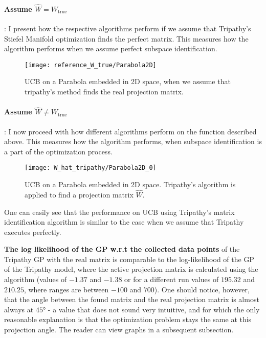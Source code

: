 \paragraph{Assume $\hat{W} = W_{\text{true}}$}: I present how the respective algorithms perform if we assume that Tripathy's Stiefel Manifold optimization finds the perfect matrix.
This measures how the algorithm performs when we assume perfect subspace identification.

\begin{figure}[H]
  \centering
      \texttt{[image: reference\_W\_true/Parabola2D]}
  \caption{UCB on a Parabola embedded in 2D space, when we assume that tripathy's method finds the real projection matrix.}
\end{figure}

\paragraph{Assume $\hat{W} \neq W_{\text{true}}$}: I now proceed with how different algorithms perform on the function described above.
This measures how the algorithm performs, when subspace identification is a part of the optimization process.

\begin{figure}[H]
  \centering
      \texttt{[image: W\_hat\_tripathy/Parabola2D\_0]}
  \caption{UCB on a Parabola embedded in 2D space.
  Tripathy's algorithm is applied to find a projection matrix $\hat{W}$.}
\end{figure}

One can easily see that the performance on UCB using Tripathy's matrix identification algorithm is similar to the case when we assume that Tripathy executes perfectly.



\textbf{The log likelihood of the GP w.r.t the collected data points} of the Tripathy GP with the real matrix is comparable to the log-likelihood of the GP of the Tripathy model, where the active projection matrix is calculated using the algorithm (values of $-1.37$ and $-1.38$ or for a different run values of $195.32$ and $210.25$, where ranges are between  $-100$ and $700$).
One should notice, however, that the angle between the found matrix and the real projection matrix is almost always at $45°$ - a value that does not sound very intuitive, and for which the only reasonable explanation is that the optimization problem stays the same at this projection angle.
The reader can view graphs in a subsequent subsection.

